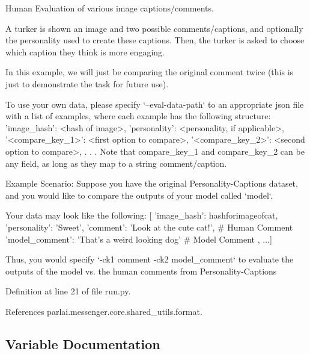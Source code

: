 \begin{DoxyVerb}    Human Evaluation of various image captions/comments.

    A turker is shown an image and two possible comments/captions, and
    optionally the personality used to create these captions. Then, the
    turker is asked to choose which caption they think is more engaging.

    In this example, we will just be comparing the original comment twice
    (this is just to demonstrate the task for future use).

    To use your own data, please specify `--eval-data-path` to an
    appropriate json file with a list of examples, where each example
    has the following structure:
        {
            'image_hash': <hash of image>,
            'personality': <personality, if applicable>,
            '<compare_key_1>': <first option to compare>,
            '<compare_key_2>': <second option to compare>,
            .
            .
            .
        }
    Note that compare_key_1 and compare_key_2 can be any field, as long as they
    map to a string comment/caption.

    Example Scenario:
        Suppose you have the original Personality-Captions dataset, and
        you would like to compare the outputs of your model called `model`.

        Your data may look like the following:
        [{
            'image_hash': hashforimageofcat,
            'personality': 'Sweet',
            'comment': 'Look at the cute cat!', # Human Comment
            'model_comment': 'That's a weird looking dog' # Model Comment
        }, ...]

        Thus, you would specify `-ck1 comment -ck2 model_comment` to evaluate
        the outputs of the model vs. the human comments from Personality-Captions
\end{DoxyVerb}
 

Definition at line 21 of file run.\+py.



References parlai.\+messenger.\+core.\+shared\+\_\+utils.\+format.



\subsection{Variable Documentation}
\mbox{\label{namespacestack__rank__evals_1_1run_aa9e7faafd240a56b1961d5f2d8ecdf6d}} 
